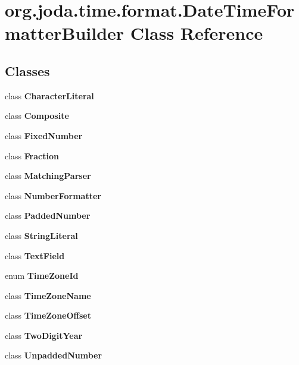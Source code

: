 \hypertarget{classorg_1_1joda_1_1time_1_1format_1_1_date_time_formatter_builder}{\section{org.\-joda.\-time.\-format.\-Date\-Time\-Formatter\-Builder Class Reference}
\label{classorg_1_1joda_1_1time_1_1format_1_1_date_time_formatter_builder}
}
\subsection*{Classes}
\begin{DoxyCompactItemize}
\item 
class {\bfseries Character\-Literal}
\item 
class {\bfseries Composite}
\item 
class {\bfseries Fixed\-Number}
\item 
class {\bfseries Fraction}
\item 
class {\bfseries Matching\-Parser}
\item 
class {\bfseries Number\-Formatter}
\item 
class {\bfseries Padded\-Number}
\item 
class {\bfseries String\-Literal}
\item 
class {\bfseries Text\-Field}
\item 
enum {\bfseries Time\-Zone\-Id}
\item 
class {\bfseries Time\-Zone\-Name}
\item 
class {\bfseries Time\-Zone\-Offset}
\item 
class {\bfseries Two\-Digit\-Year}
\item 
class {\bfseries Unpadded\-Number}
\end{DoxyCompactItemize}
